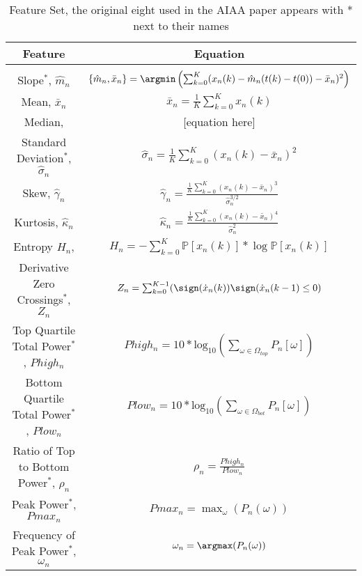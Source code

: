 \begin{table*}[t]
\centering %
\begin{tabular}{c c} %
\hline\hline %
Feature & Equation \\ [0.5ex] %
\hline \\ [0.5ex] %
Slope$^*$, $\hat{m}_n$ & $\{\hat{m}_n, \bar{x}_n\} =
\argmin\left(\sum_{k=0}^{K}
(x_n(k)-\hat{m}_n(t(k)-t(0))-\bar{x}_n)^2\right) $ \\ [1ex] %
Mean, $\bar{x}_n$ & $\bar{x}_n = \frac{1}{K} \sum_{k=0}^{K} x_n(k)$ \\ [1ex]

Median,  & [equation here] \\ [1ex]

Standard Deviation$^*$, $\hat{\sigma}_n$ & $\hat{\sigma}_n = \frac{1}{K}
\sum_{k=0}^{K} (x_n(k)-\bar{x}_n)^2 $ \\ [1ex]

Skew, $\hat{\gamma}_n$ & $\hat{\gamma}_n = \frac{\frac{1}{K}
\sum_{k=0}^{K} (x_n(k)-\bar{x}_n)^3}{\hat{\sigma}_n^{3/2}} $ \\ [1ex]

Kurtosis, $\hat{\kappa}_n$ & $\hat{\kappa}_n = \frac{\frac{1}{K}
  \sum_{k=0}^{K} (x_n(k)-\bar{x}_n)^4}{\hat{\sigma}_n^2} $ \\ [1ex]

Entropy $H_n$, & $H_n = - \sum_{k=0}^{K} \mathbb{P}[x_n(k)] * \log \mathbb{P}[x_n(k)]$ \\ [1ex] 

Derivative Zero Crossings$^*$, $Z_n$ & $Z_n = \sum_{k=0}^{K-1} (\sign(\dot{x}_n(k))\sign(\dot{x}_n(k-1) \leq 0) $ \\ [1ex] 
Top Quartile Total Power$^*$, $Phigh_n$  & $Phigh_n = 10*\text{log}_{10}(\sum_{\omega\in\Omega_{top}} P_n[\omega])  $ \\ [1ex] 
Bottom Quartile Total Power$^*$, $Plow_n$  & $Plow_n = 10*\text{log}_{10}(\sum_{\omega\in\Omega_{bot}} P_n[\omega])  $ \\ [1ex] 
Ratio of Top to Bottom Power$^*$, $\rho_n$  & $\rho_n = \frac{Phigh_n}{Plow_n}  $ \\ [1ex]  %
Peak Power$^*$, $Pmax_n$ & $Pmax_n = \max_\omega(P_n(\omega))$  \\ [1ex]
Frequency of Peak Power$^*$, $\omega_n$ & $\omega_n = \argmax(P_n(\omega))$  \\ [1ex]
\end{tabular}
\caption{Feature Set, the original eight used in the AIAA paper
  appears with * next to their names} %
\label{table:features} %
\end{table*}

